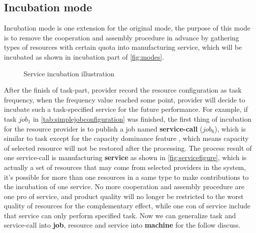 \subsection{Incubation mode} %
\label{sub:incubation_mode}
Incubation mode is one extension for the original mode, the purpose of this mode is to remove the cooperation and assembly procedure in advance by gathering types of resources with certain quota into manufacturing service, which will be incubated as shown in incubation part of \autoref{fig:modes}.
\begin{figure}[htbp]
    \centering
    \scriptsize
    \resizebox{.65\textwidth}{!}{}
    \caption{Service incubation illustration}
    \label{fig:servicefigure}
\end{figure}
After the finish of task-part, provider record the resource configuration as task frequency, when the frequency value reached some point, provider will decide to incubate such a task-specified service for the future performance. For example, if task $job_1$ in \autoref{tab:simplejobconfiguration} was finished, the first thing of incubation for the resource provider is to publish a job named \textbf{service-call} ($job_6$), which is similar to task except for the capacity dominance feature , which means capacity of selected resource will not be restored after the processing. The process result of one service-call is manufacturing \textbf{service} as shown in \autoref{fig:servicefigure}, which is actually a set of resources that may come from selected providers in the system, it's possible for more than one resources in a same type to make contributions to the incubation of one service. No more cooperation and assembly procedure are one pro of service, and product quality will no longer be restricted to the worst quality of resources for the complementary effect, while one con of service include that service can only perform specified task.
Now we can generalize task and service-call into \textbf{job}, resource and service into \textbf{machine} for the follow discuss.

